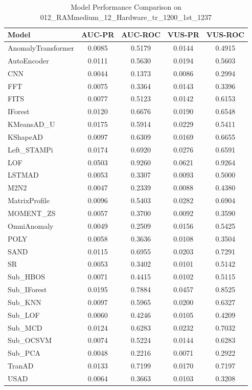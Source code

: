 \documentclass[12pt,oneside]{article}
\begin{document}
\begin{table}[H]
    \centering
    \caption{Model Performance Comparison on 012\_RAMmedium\_12\_Hardware\_tr\_1200\_1st\_1237}
    \begin{tabular}{|l|c|c|c|c|}
        \toprule
        \textbf{Model} & \textbf{AUC-PR} & \textbf{AUC-ROC} & \textbf{VUS-PR} & \textbf{VUS-ROC} \\
        \midrule
        AnomalyTransformer & 0.0085 & 0.5179 & 0.0144 & 0.4915 \\
        AutoEncoder & 0.0111 & 0.5630 & 0.0194 & 0.5603 \\
        CNN & 0.0044 & 0.1373 & 0.0086 & 0.2994 \\
        FFT & 0.0075 & 0.3364 & 0.0143 & 0.3396 \\
        FITS & 0.0077 & 0.5123 & 0.0142 & 0.6153 \\
        IForest & 0.0120 & 0.6676 & 0.0190 & 0.6548 \\
        KMeansAD\_U & 0.0175 & 0.5914 & 0.0229 & 0.5411 \\
        KShapeAD & 0.0097 & 0.6309 & 0.0169 & 0.6655 \\
        Left\_STAMPi & 0.0174 & 0.6920 & 0.0276 & 0.6591 \\
        LOF & 0.0503 & 0.9260 & 0.0621 & 0.9264 \\
        LSTMAD & 0.0053 & 0.3307 & 0.0093 & 0.5000 \\
        M2N2 & 0.0047 & 0.2339 & 0.0088 & 0.4380 \\
        MatrixProfile & 0.0096 & 0.5403 & 0.0282 & 0.6904 \\
        MOMENT\_ZS & 0.0057 & 0.3700 & 0.0092 & 0.3590 \\
        OmniAnomaly & 0.0049 & 0.2509 & 0.0156 & 0.5425 \\
        POLY & 0.0058 & 0.3636 & 0.0108 & 0.3504 \\
        SAND & 0.0115 & 0.6955 & 0.0203 & 0.7291 \\
        SR & 0.0053 & 0.3402 & 0.0101 & 0.5142 \\
        Sub\_HBOS & 0.0071 & 0.4415 & 0.0102 & 0.5115 \\
        Sub\_IForest & 0.0195 & 0.7884 & 0.0457 & 0.8525 \\
        Sub\_KNN & 0.0097 & 0.5965 & 0.0200 & 0.6327 \\
        Sub\_LOF & 0.0060 & 0.4246 & 0.0105 & 0.4209 \\
        Sub\_MCD & 0.0124 & 0.6283 & 0.0232 & 0.7032 \\
        Sub\_OCSVM & 0.0074 & 0.5224 & 0.0144 & 0.6283 \\
        Sub\_PCA & 0.0048 & 0.2216 & 0.0071 & 0.2922 \\
        TranAD & 0.0133 & 0.7199 & 0.0170 & 0.7197 \\
        USAD & 0.0064 & 0.3663 & 0.0103 & 0.3208 \\
        \bottomrule
    \end{tabular}

    \label{tab:model_performance_RAMmedium}
\end{table}
\end{document}
